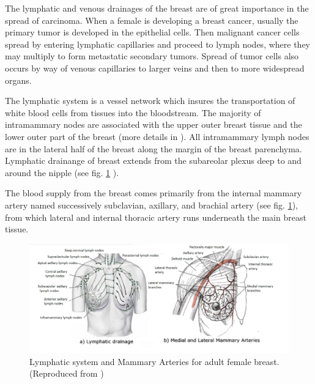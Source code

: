 The lymphatic and venous drainages of the breast are of great importance in the spread of carcinoma. When a female is developing a breast cancer, usually the primary tumor is developed in the epithelial cells. Then malignant cancer cells spread by entering lymphatic capillaries and proceed to lymph nodes, where they may multiply to form metastatic secondary tumors. Spread of tumor cells also occurs by way of venous capillaries to larger veins and then to more widespread organs.

The lymphatic system is a vessel network which insures the transportation of white blood cells from tissues into the bloodstream. The majority of intramammary nodes are associated with the upper outer breast tissue and the lower outer part of the breast (more details in \cite{kopans_daniel_b_breast_2007}).  All intramammary lymph nodes are in the lateral half of the breast along the margin of the breast parenchyma.  Lymphatic drainange of breast extends from the subareolar plexus deep to and around the nipple (see fig. \ref{lyphaticDrainage} ).

The blood supply from the breast comes primarily from the internal mammary artery named successively subclavian, axillary, and brachial artery (see fig. \ref{lyphaticDrainage}), from which lateral and internal thoracic artery runs underneath the main breast tissue.

	
\begin{center}
\begin{figure}
\includegraphics[width=\textwidth,height=\textheight,keepaspectratio]{figures/lyphaticDrainage.PNG} 
\caption[Lymphatic system and Mammary Arteries for adult female breast]{Lymphatic system and Mammary Arteries for adult female breast.(Reproduced from \cite{clemente_anatomy:_2011})}
\label{lyphaticDrainage}
\end{figure}
\end{center}




